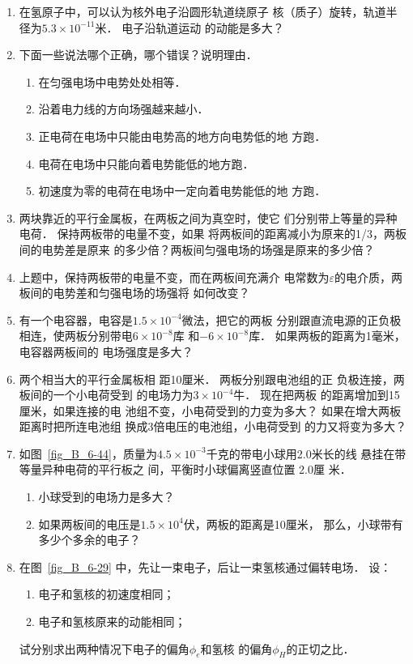 \begin{enumerate}
\item 在氢原子中，可以认为核外电子沿圆形轨道绕原子
核（质子）旋转，轨道半径为$5.3\times10^{-11}$米．
电子沿轨道运动
的动能是多大？
\item 下面一些说法哪个正确，哪个错误？说明理由．
\begin{enumerate}
\item 在匀强电场中电势处处相等．
\item 沿着电力线的方向场强越来越小．
\item 正电荷在电场中只能由电势高的地方向电势低的地
方跑．
\item 电荷在电场中只能向着电势能低的地方跑．
\item 初速度为零的电荷在电场中一定向着电势能低的地
方跑．
\end{enumerate}
\item 两块靠近的平行金属板，在两板之间为真空时，使它
们分别带上等量的异种电荷．
保持两板带的电量不变，如果
将两板间的距离减小为原来的1/3，两板间的电势差是原来
的多少倍？两板间匀强电场的场强是原来的多少倍？
\item 上题中，保持两板带的电量不变，而在两板间充满介
电常数为$\varepsilon$的电介质，两板间的电势差和匀强电场的场强将
如何改变？
\item 有一个电容器，电容是$1.5\times10^{-4}$微法，把它的两板
分别跟直流电源的正负极相连，使两板分别带电$6\times10^{-8}$库
和$-6\times10^{-8}$库．
如果两板的距离为1毫米，电容器两板间的
电场强度是多大？
\item 两个相当大的平行金属板相
距10厘米．
两板分别跟电池组的正
负极连接，两板间的一个小电荷受到
的电场力为$3\times10^{-4}$牛．
现在把两板
的距离增加到15厘米，如果连接的电
池组不变，小电荷受到的力变为多大？
如果在增大两板距离时把所连电池组
换成3倍电压的电池组，小电荷受到
的力又将变为多大？



\item 如图~\ref{fig_B_6-44}，质量为$4.5\times
10^{-3}$千克的带电小球用2.0米长的线
悬挂在带等量异种电荷的平行板之
间，平衡时小球偏离竖直位置 2.0厘
米．
\begin{enumerate}
    \item 小球受到的电场力是多大？
    \item 如果两板间的电压是$1.5\times10^4$伏，两板的距离是10厘米，
那么，小球带有多少个多余的电子？
\end{enumerate}
    

\item 在图~\ref{fig_B_6-29} 中，先让一束电子，后让一束氢核通过偏转电场．
设：
\begin{enumerate}
	\item
	电子和氢核的初速度相同；
	\item
	电子和氢核原来的动能相同；
\end{enumerate}
试分别求出两种情况下电子的偏角$\phi_e$和氢核
的偏角$\phi_H$的正切之比．




\end{enumerate}
